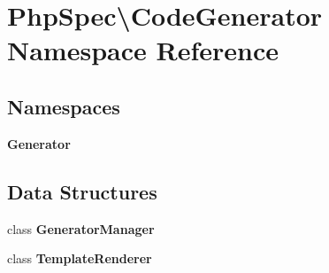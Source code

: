 \section{Php\+Spec\textbackslash{}Code\+Generator Namespace Reference}
\label{namespace_php_spec_1_1_code_generator}
\subsection*{Namespaces}
\begin{DoxyCompactItemize}
\item 
 {\bf Generator}
\end{DoxyCompactItemize}
\subsection*{Data Structures}
\begin{DoxyCompactItemize}
\item 
class {\bf Generator\+Manager}
\item 
class {\bf Template\+Renderer}
\end{DoxyCompactItemize}
